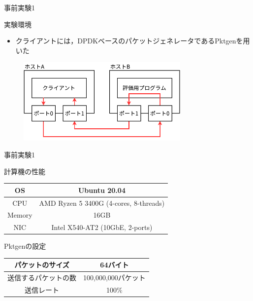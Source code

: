 \documentclass[12pt, unicode]{beamer}
\begin{document}
\begin{frame}{事前実験1}
  \begin{block}{実験環境}
    \begin{itemize}
      \item クライアントには，DPDKベースのパケットジェネレータであるPktgenを用いた
    \end{itemize}
  \end{block}

  \begin{figure}[h]
    \centering
    \includegraphics[width=0.75\textwidth]{pictures/PreExperimentNetwork.pdf}
  \end{figure}
\end{frame}

\begin{frame}{事前実験1}
  \begin{block}{計算機の性能}
    \begin{table}[htb]
      \begin{tabular}{|c|c|} \hline
        OS     & Ubuntu 20.04                           \\ \hline
        CPU    & AMD Ryzen 5 3400G (4-cores, 8-threads) \\ \hline
        Memory & 16GB                                   \\ \hline
        NIC    & Intel X540-AT2 (10GbE, 2-ports)        \\ \hline
      \end{tabular}
    \end{table}
  \end{block}

  \begin{block}{Pktgenの設定}
    \begin{table}[htb]
      \begin{tabular}{|c|c|} \hline
        パケットのサイズ     & 64バイト \\ \hline
        送信するパケットの数 & 100,000,000パケット \\ \hline
        送信レート           & 100\%               \\ \hline
      \end{tabular}
    \end{table}
  \end{block}
\end{frame}
\end{document}

